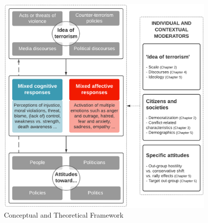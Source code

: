 \begin{figure}[H]
\centering
\includegraphics[width=0.96\textwidth]{Chapter_1/intro-figure1.pdf}
\caption{Conceptual and Theoretical Framework}
\label{fig:intro-theory}    
\end{figure}
\newpage



